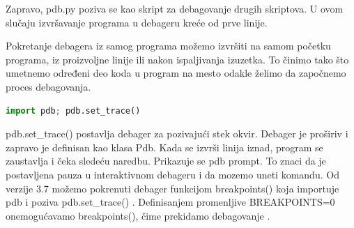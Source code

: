 \documentclass[a4paper]{article}
\begin{document}
Zapravo, pdb.py poziva se kao skript za debagovanje drugih skriptova. U ovom slučaju izvršavanje programa u debageru kreće od prve linije.

Pokretanje debagera iz samog programa možemo izvršiti na samom početku programa, iz proizvoljne linije ili nakon ispaljivanja izuzetka. To činimo tako što umetnemo određeni deo koda u program na mesto odakle želimo da započnemo proces debagovanja.
\begin{lstlisting}[language = python, caption = {Započinjemo debagovanje}]
import pdb; pdb.set_trace()
\end{lstlisting}
pdb.set\_trace() postavlja debager za pozivajući stek okvir. Debager je proširiv i zapravo je definisan kao klasa Pdb. Kada se izvrši linija iznad, program se zaustavlja i čeka sledeću naredbu. Prikazuje se pdb prompt. To znaci da je postavljena pauza u interaktivnom debageru i da mozemo uneti komandu.
Od verzije 3.7 možemo pokrenuti debager funkcijom breakpoints() koja importuje pdb i poziva pdb.set\_trace() \cite{pdbExamples}. Definisanjem promenljive BREAKPOINTS=0 onemogućavamo breakpoints(), čime prekidamo debagovanje \cite{pdbExamples}.
\end{document}
